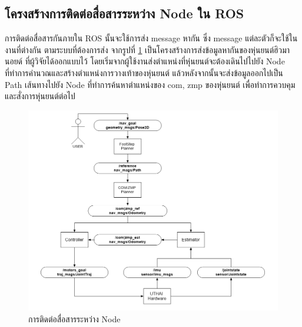 \subsection{โครงสร้างการติดต่อสื่อสารระหว่าง Node ใน ROS}
การติดต่อสื่อสารกันภายใน ROS นั้นจะใช้การส่ง message หากัน ซึ่ง message แต่ละตัวก็จะใช้ในงานที่ต่างกัน
ตามระบบที่ต้องการส่ง จากรูปที่ \ref{fig:uthai_ros_node} เป็นโครงสร้างการส่งข้อมูลหากันของหุ่นยนต์ฮิวมานอยด์
ที่ผู้วิจัยได้ออกแบบไว้ โดยเริ่มจากผู้ใช้งานส่งตำแหน่งที่หุ่นยนต์จะต้องเดินไปไปยัง Node ที่ทำการคำนวณและสร้างตำแหน่งการวางเท้าของหุ่นยนต์
แล้วหลังจากนั้นจะส่งข้อมูลออกไปเป็น Path เส้นทางไปยัง Node ที่ทำการค้นหาตำแหน่งของ com, zmp ของหุ่นยนต์
เพื่อทำการควบคุมและสั่งการหุ่นยนต์ต่อไป

\begin{figure}[!ht]
	\centering
	\includegraphics[width=\textwidth]{chapter3/images/uthai_ros_node.png}
	\caption{การติดต่อสื่อสารระหว่าง Node}
	\label{fig:uthai_ros_node}
\end{figure}

